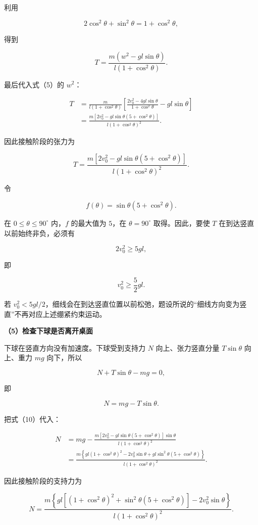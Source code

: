 \documentclass[12pt,a4paper,UTF8]{ctexart}
\begin{document}
利用

\[
2\cos^2\theta+\sin^2\theta=1+\cos^2\theta,
\]

得到

\[
T=\frac{m(w^2-gl\sin\theta)}{l(1+\cos^2\theta)}.
\tag{10h}
\]

最后代入式（5）的 \(w^2\)：

\[
\begin{aligned}
T
&=\frac{m}{l(1+\cos^2\theta)}
\left[
\frac{2v_0^2-4gl\sin\theta}{1+\cos^2\theta}
-gl\sin\theta
\right]\\
&=\frac{m\left[2v_0^2-gl\sin\theta(5+\cos^2\theta)\right]}
{l(1+\cos^2\theta)^2}.
\end{aligned}
\]

因此接触阶段的张力为

\[
T=\frac{m\left[2v_0^2-gl\sin\theta(5+\cos^2\theta)\right]}
{l(1+\cos^2\theta)^2}.
\tag{10}
\]

令

\[
f(\theta)=\sin\theta(5+\cos^2\theta).
\]

在 \(0\leq\theta\leq90^\circ\) 内，\(f\) 的最大值为 \(5\)，在
\(\theta=90^\circ\) 取得。因此，要使 \(T\)
在到达竖直以前始终非负，必须有

\[
2v_0^2\geq5gl,
\]

即

\[
v_0^2\geq\frac52gl.
\tag{11}
\]

若
\(v_0^2<5gl/2\)，细线会在到达竖直位置以前松弛，题设所说的``细线方向变为竖直''不再对应上述绷紧约束运动。

\textbf{（5）检查下球是否离开桌面}

下球在竖直方向没有加速度。下球受到支持力 \(N\) 向上、张力竖直分量
\(T\sin\theta\) 向上、重力 \(mg\) 向下，所以

\[
N+T\sin\theta-mg=0,
\]

即

\[
N=mg-T\sin\theta.
\tag{12a}
\]

把式（10）代入：

\[
\begin{aligned}
N
&=mg-
\frac{m\left[2v_0^2-gl\sin\theta(5+\cos^2\theta)\right]\sin\theta}
{l(1+\cos^2\theta)^2}\\
&=\frac{m\left\{gl(1+\cos^2\theta)^2
-2v_0^2\sin\theta
+gl\sin^2\theta(5+\cos^2\theta)\right\}}
{l(1+\cos^2\theta)^2}.
\end{aligned}
\]

因此接触阶段的支持力为

\[
N=
\frac{m\left\{gl\left[(1+\cos^2\theta)^2+
\sin^2\theta(5+\cos^2\theta)\right]-2v_0^2\sin\theta\right\}}
{l(1+\cos^2\theta)^2}.
\tag{12}
\]
\end{document}
